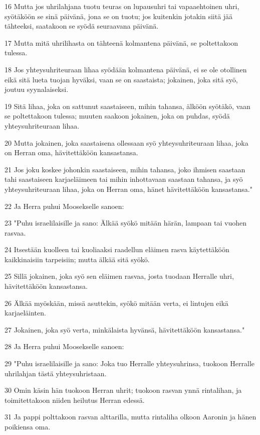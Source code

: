 \par 16 Mutta jos uhrilahjana tuotu teuras on lupausuhri tai vapaaehtoinen uhri, syötäköön se sinä päivänä, jona se on tuotu; jos kuitenkin jotakin siitä jää tähteeksi, saatakoon se syödä seuraavana päivänä.
\par 17 Mutta mitä uhrilihasta on tähteenä kolmantena päivänä, se poltettakoon tulessa.
\par 18 Jos yhteysuhriteuraan lihaa syödään kolmantena päivänä, ei se ole otollinen eikä sitä lueta tuojan hyväksi, vaan se on saastaista; jokainen, joka sitä syö, joutuu syynalaiseksi.
\par 19 Sitä lihaa, joka on sattunut saastaiseen, mihin tahansa, älköön syötäkö, vaan se poltettakoon tulessa; muuten saakoon jokainen, joka on puhdas, syödä yhteysuhriteuraan lihaa.
\par 20 Mutta jokainen, joka saastaisena ollessaan syö yhteysuhriteuraan lihaa, joka on Herran oma, hävitettäköön kansastansa.
\par 21 Jos joku koskee johonkin saastaiseen, mihin tahansa, joko ihmisen saastaan tahi saastaiseen karjaeläimeen tai mihin inhottavaan saastaan tahansa, ja syö yhteysuhriteuraan lihaa, joka on Herran oma, hänet hävitettäköön kansastansa."
\par 22 Ja Herra puhui Moosekselle sanoen:
\par 23 "Puhu israelilaisille ja sano: Älkää syökö mitään härän, lampaan tai vuohen rasvaa.
\par 24 Itsestään kuolleen tai kuoliaaksi raadellun eläimen rasva käytettäköön kaikkinaisiin tarpeisiin; mutta älkää sitä syökö.
\par 25 Sillä jokainen, joka syö sen eläimen rasvaa, josta tuodaan Herralle uhri, hävitettäköön kansastansa.
\par 26 Älkää myöskään, missä asuttekin, syökö mitään verta, ei lintujen eikä karjaeläinten.
\par 27 Jokainen, joka syö verta, minkälaista hyvänsä, hävitettäköön kansastansa."
\par 28 Ja Herra puhui Moosekselle sanoen:
\par 29 "Puhu israelilaisille ja sano: Joka tuo Herralle yhteysuhrinsa, tuokoon Herralle uhrilahjan tästä yhteysuhristaan.
\par 30 Omin käsin hän tuokoon Herran uhrit; tuokoon rasvan ynnä rintalihan, ja toimitettakoon niiden heilutus Herran edessä.
\par 31 Ja pappi polttakoon rasvan alttarilla, mutta rintaliha olkoon Aaronin ja hänen poikiensa oma.
